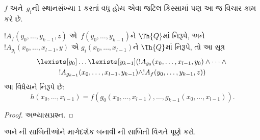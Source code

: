 \documentclass[../../../include/open-logic-section]{subfiles}
\begin{document}
$f$ અને~$g_i$ની સ્થાનસંખ્યા
$1$ કરતાં વધુ હોય એવા જટિલ
કિસ્સામાં પણ આ જ વિચાર કામ કરે છે.

\begin{prop}
$!A_f(y_0, \dots, y_{k-1}, z)$
એ~$f(y_0, \dots, y_{k-1})$ને
$\Th{Q}$માં નિરૂપે, અને
$!A_{g_i}(x_0, \dots, x_{l-1}, y)$
એ $g_i(x_0, \dots, x_{l-1})$ને
$\Th{Q}$માં નિરૂપે, તો આ સૂત્ર
\begin{multline*}
  \lexists[y_0]\dots\lexists[y_{k-1}]
  (!A_{g_0}(x_0,\dots,x_{l-1},y_0) \land
      \dots \land {}\\
  !A_{g_{k-1}}(x_0,\dots,x_{l-1},y_{k-1}) \land !A_f(y_0,\dots,y_{k-1},z))
\end{multline*}
આ વિધેયને નિરૂપે છે:
\[
h(x_0, \dots, x_{l-1}) = f(g_0(x_0, \dots, x_{l-1}), \dots, g_{k-1}(x_0,
\dots, x_{l-1})).
\]
\end{prop}

\begin{proof}
અભ્યાસપ્રશ્ન.
\end{proof}

\begin{prob}
અને ની
સાબિતીઓને માર્ગદર્શક બનાવી
ની
સાબિતી વિગતે પૂર્ણ કરો.
\end{prob}
\end{document}
